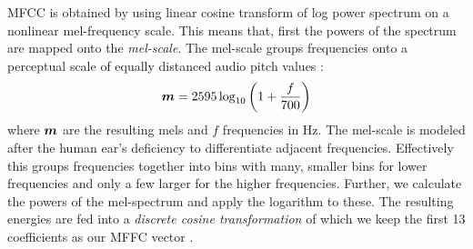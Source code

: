 MFCC is obtained by using linear cosine transform of log power spectrum on a nonlinear mel-frequency scale. This means that, first the powers of the spectrum are mapped onto the \emph{mel-scale}. The mel-scale groups frequencies onto a perceptual scale of equally distanced audio pitch values \cite{stevens1937scale}: 
$$
\boldsymbol{m} = 2595 \log_{10}\left(1+{\frac {f}{700}}\right)
$$
where $\boldsymbol{m}$ are the resulting mels and $f$ frequencies in Hz. The mel-scale is modeled after the human ear's deficiency to differentiate adjacent frequencies. Effectively this groups frequencies together into bins with many, smaller bins for lower frequencies and only a few larger for the higher frequencies. Further, we calculate the powers of the mel-spectrum and apply the logarithm to these. The resulting energies are fed into a \emph{discrete cosine transformation} of which we keep the first 13 coefficients as our MFFC vector \cite{sahidullah2012design}. 
